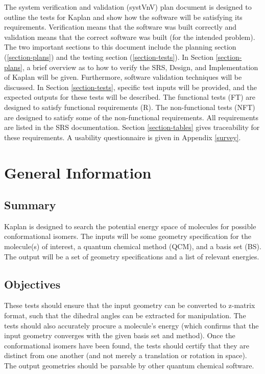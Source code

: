 \documentclass[12pt, titlepage]{article}
\newcommand{\progname}{Kaplan} %
\begin{document}
The system verification and validation (systVnV) plan document is designed to 
outline the tests for \progname{} and show how the software will be satisfying 
its requirements. Verification means that the software was built correctly and 
validation means that the correct software was built (for the intended 
problem). The two important sections to this document include the planning 
section (\ref{section-plans}) and the testing section (\ref{section-tests}). In 
Section \ref{section-plans}, a brief overview as to how to verify the SRS, 
Design, and Implementation of \progname{} will be given. Furthermore, software 
validation techniques will be discussed. In Section \ref{section-tests}, 
specific test inputs will be provided, and the expected outputs for these tests 
will be described. The functional tests (FT) are designed to satisfy functional 
requirements (R). The non-functional tests (NFT) are designed to satisfy some 
of the non-functional requirements. All requirements are listed in the SRS 
documentation. Section \ref{section-tables} gives traceability for these 
requirements. A usability questionnaire is given in Appendix \ref{survey}.

\section{General Information}

\subsection{Summary}

\progname{} is designed to search the potential energy space of molecules for 
possible conformational isomers. The inputs will be some geometry specification 
for the molecule(s) of interest, a quantum chemical method (QCM), and a basis 
set (BS). The output will be a set of geometry specifications and a list of relevant 
energies.

\subsection{Objectives}

These tests should ensure that the input geometry can be converted to z-matrix 
format, such that the dihedral angles can be extracted for manipulation. The 
tests should also accurately procure a molecule's energy (which confirms that 
the input geometry converges with the given basis set and method). Once the 
conformational isomers have been found, the tests should certify that they are 
distinct from one another (and not merely a translation or rotation in space). 
The output geometries should be parsable by other quantum chemical software.
\end{document}
